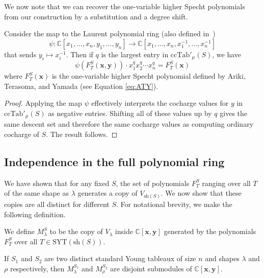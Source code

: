 \documentclass[ALCO,Unicode]{cedram}
\newcommand{\SYT}{\mathrm{SYT}}
\newcommand{\ccind}{\mathrm{ccTab}}
\newcommand{\sh}{\mathrm{sh}}
\begin{document}
We now note that we can recover the one-variable higher Specht polynomials from our construction by a substitution and a degree shift.

\begin{lemma}\label{lem:x-inverse}
	Consider the map to the Laurent polynomial ring (also defined in~\cite{HookBases}) $$\psi:\mathbb{C}[x_1,\ldots,x_n,y_1,\ldots,y_n]\to \mathbb{C}[x_1,\ldots,x_n,x_1^{-1},\ldots,x_n^{-1}]$$ that sends $y_i\mapsto x_i^{-1}$.   Then if $q$ is the largest entry in $\ccind'_\mu(S)$, we have $$\psi(F_T^S(\mathbf{x},\mathbf{y}))\cdot x_1^qx_2^q\cdots x_n^q=F_T^S(\mathbf{x})$$ where $F_T^S(\mathbf{x})$ is the one-variable higher Specht polynomial  defined by Ariki, Terasoma, and Yamada (see Equation \eqref{eq:ATY}).
\end{lemma}

\begin{proof}
	Applying the map $\psi$ effectively interprets the cocharge values for $y$ in $\ccind'_\mu(S)$ as negative entries.  Shifting all of these values up by $q$ gives the same descent set and therefore the same cocharge values as computing ordinary cocharge of $S$. The result follows.  
\end{proof}


\subsection{Independence in the full polynomial ring}

We have shown that for any fixed $S$, the set of polynomials $F_{T}^S$ ranging over all $T$ of the same shape as $\lambda$ generates a copy of $V_{\sh(S)}$.  We now show that these copies are all distinct for different $S$.  For notational brevity, we make the following definition.

\begin{definition}
	We define $M_\lambda^S$ to be the copy of $V_\lambda$ inside $\mathbb{C}[\mathbf{x},\mathbf{y}]$ generated by the polynomials $F_T^S$ over all $T\in\SYT(\sh(S))$.
\end{definition}


\begin{lemma}\label{lem:disjoint}
	If $S_1$ and $S_2$ are two distinct standard Young tableaux of size $n$ and shapes $\lambda$ and $\rho$ respectively, then $M_\lambda^{S_1}$ and $M_{\rho}^{S_2}$ are disjoint submodules of $\mathbb{C}[\mathbf{x},\mathbf{y}]$.
\end{lemma}
\end{document}

